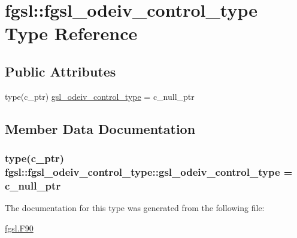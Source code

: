 \hypertarget{structfgsl_1_1fgsl__odeiv__control__type}{\section{fgsl\-:\-:fgsl\-\_\-odeiv\-\_\-control\-\_\-type Type Reference}
\label{structfgsl_1_1fgsl__odeiv__control__type}
}
\subsection*{Public Attributes}
\begin{DoxyCompactItemize}
\item 
type(c\-\_\-ptr) \hyperlink{structfgsl_1_1fgsl__odeiv__control__type_aa6b9079ecc7b2e0b6d306501a41c6acd}{gsl\-\_\-odeiv\-\_\-control\-\_\-type} = c\-\_\-null\-\_\-ptr
\end{DoxyCompactItemize}


\subsection{Member Data Documentation}
\hypertarget{structfgsl_1_1fgsl__odeiv__control__type_aa6b9079ecc7b2e0b6d306501a41c6acd}{
\subsubsection[{gsl\-\_\-odeiv\-\_\-control\-\_\-type}]{\setlength{\rightskip}{0pt plus 5cm}type(c\-\_\-ptr) fgsl\-::fgsl\-\_\-odeiv\-\_\-control\-\_\-type\-::gsl\-\_\-odeiv\-\_\-control\-\_\-type = c\-\_\-null\-\_\-ptr}}\label{structfgsl_1_1fgsl__odeiv__control__type_aa6b9079ecc7b2e0b6d306501a41c6acd}


The documentation for this type was generated from the following file\-:\begin{DoxyCompactItemize}
\item 
\hyperlink{fgsl_8F90}{fgsl.\-F90}\end{DoxyCompactItemize}
